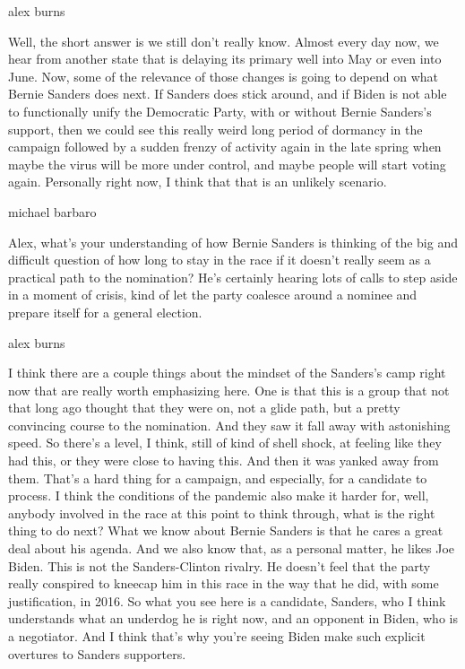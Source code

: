 alex burns

Well, the short answer is we still don't really know. Almost every day
now, we hear from another state that is delaying its primary well into
May or even into June. Now, some of the relevance of those changes is
going to depend on what Bernie Sanders does next. If Sanders does stick
around, and if Biden is not able to functionally unify the Democratic
Party, with or without Bernie Sanders's support, then we could see this
really weird long period of dormancy in the campaign followed by a
sudden frenzy of activity again in the late spring when maybe the virus
will be more under control, and maybe people will start voting again.
Personally right now, I think that that is an unlikely scenario.

michael barbaro

Alex, what's your understanding of how Bernie Sanders is thinking of the
big and difficult question of how long to stay in the race if it doesn't
really seem as a practical path to the nomination? He's certainly
hearing lots of calls to step aside in a moment of crisis, kind of let
the party coalesce around a nominee and prepare itself for a general
election.

alex burns

I think there are a couple things about the mindset of the Sanders's
camp right now that are really worth emphasizing here. One is that this
is a group that not that long ago thought that they were on, not a glide
path, but a pretty convincing course to the nomination. And they saw it
fall away with astonishing speed. So there's a level, I think, still of
kind of shell shock, at feeling like they had this, or they were close
to having this. And then it was yanked away from them. That's a hard
thing for a campaign, and especially, for a candidate to process. I
think the conditions of the pandemic also make it harder for, well,
anybody involved in the race at this point to think through, what is the
right thing to do next? What we know about Bernie Sanders is that he
cares a great deal about his agenda. And we also know that, as a
personal matter, he likes Joe Biden. This is not the Sanders-Clinton
rivalry. He doesn't feel that the party really conspired to kneecap him
in this race in the way that he did, with some justification, in 2016.
So what you see here is a candidate, Sanders, who I think understands
what an underdog he is right now, and an opponent in Biden, who is a
negotiator. And I think that's why you're seeing Biden make such
explicit overtures to Sanders supporters.

